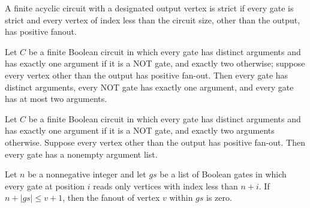 \begin{definition}
\label{BoolCircuit.DAGCircuit.IsStrict}
\leanok
{}
A finite acyclic circuit with a designated output vertex is strict if every gate is
strict and every vertex of index less than the circuit size, other than the output, has
positive fanout.
\end{definition}

\begin{theorem}
\label{BoolCircuit.DAGCircuit.IsStrict.isFaninTwo}
\leanok
{}
Let $C$ be a finite Boolean circuit in which every gate has distinct arguments and has
exactly one argument if it is a NOT gate, and exactly two otherwise; suppose every
vertex other than the output has positive fan-out. Then every gate has distinct
arguments, every NOT gate has exactly one argument, and every gate has at most two
arguments.
\end{theorem}

\begin{theorem}
\label{BoolCircuit.DAGCircuit.IsStrict.args_ne_nil}
\leanok
{}
Let $C$ be a finite Boolean circuit in which every gate has distinct arguments and has
exactly one argument if it is a NOT gate, and exactly two arguments otherwise. Suppose
every vertex other than the output has positive fan-out. Then every gate has a nonempty
argument list.
\end{theorem}

\begin{theorem}
\label{BoolCircuit.fanoutIn_last_eq_zero}
\leanok
{}
Let $n$ be a nonnegative integer and let $gs$ be a list of Boolean gates in which every
gate at position $i$ reads only vertices with index less than $n+i$. If $n+|gs|\le v+1$,
then the fanout of vertex $v$ within $gs$ is zero.
\end{theorem}

